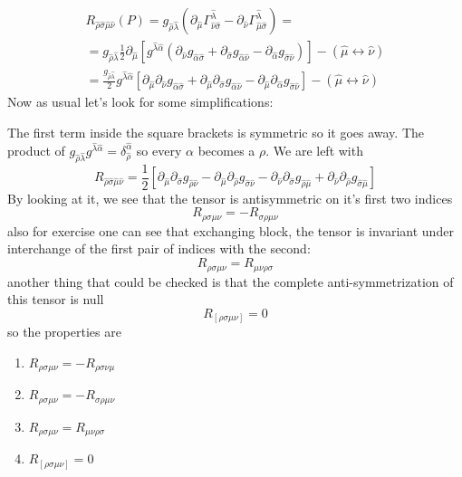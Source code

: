 \begin{gather*}
R_{\hat{\rho }\hat{\sigma }\hat{\mu }\hat{\nu }} \left( P \right) = g_{\hat{\rho }\hat{\lambda }} \left( \partial_{\hat{\mu }} \Gamma ^{\hat{\lambda }}_{\hat{\nu }\hat{\sigma }} - \partial_{\hat{\nu }} \Gamma ^{\hat{\lambda }}_{\hat{\mu }\hat{\sigma }} \right)  = \\
= g_{\hat{\rho }\hat{\lambda }} \frac{1}{2} \partial_{\hat{\mu } } [ g^{\hat{\lambda }\hat{\alpha }} \left( \partial_{\hat{\nu }} g_{\hat{\alpha  }\hat{\sigma }} + \partial_{\hat{\sigma }} g_{\hat{\alpha }\hat{\nu }} - \partial_{\hat{\alpha }} g_{\hat{\sigma }\hat{\nu }} \right) ] - \left( \hat{\mu } \leftrightarrow \hat{\nu } \right) \\
= \frac{g_{\hat{\rho }\hat{\lambda }}}{2} g^{\hat{\lambda }\hat{\alpha }} [ \partial_{\hat{\mu }} \partial_{\hat{\nu }} g_{\hat{\alpha }\hat{\sigma }} + \partial_{\hat{\mu }}\partial_{\hat{\sigma }} g_{\hat{\alpha }\hat{\nu }} - \partial_{\hat{\mu }}\partial_{\hat{\alpha }} g_{\hat{\sigma }\hat{\nu }}] - \left( \hat{\mu } \leftrightarrow \hat{\nu } \right)
\end{gather*} %
Now as usual let's look for some simplifications: \par
The first term inside the square brackets is symmetric so it goes away. The product of $g_{\hat{\rho }\hat{\lambda }} g^{\hat{\lambda }\hat{\alpha }} = \delta ^{\hat{\alpha }}_{\hat{\rho }} $ so every $\alpha $ becomes a $\rho $. We are left with
\begin{equation}
	R_{\hat{\rho }\hat{\sigma }\hat{\mu }\hat{\nu }} = \frac{1}{2} [\partial_{\hat{\mu }}\partial_{\hat{\sigma }} g_{\hat{\rho }\hat{\nu }} - \partial_{\hat{\mu }}\partial_{\hat{\rho }}g_{\hat{\sigma }\hat{\nu }} - \partial_{\hat{\nu }}\partial_{\hat{\sigma }} g_{\hat{\rho }\hat{\mu }}+ \partial_{\hat{\nu }}\partial_{\hat{\rho }}g_{\hat{\sigma }\hat{\mu }}]
\end{equation}
By looking at it, we see that the tensor is antisymmetric on it's first two indices
\[
R_{\rho \sigma \mu \nu } = - R_{\sigma \rho \mu \nu }
\]
also for exercise one can see that exchanging block, the tensor is invariant under interchange of the first pair of indices with the second:
\[
R_{\rho \sigma \mu \nu } = R_{\mu \nu \rho \sigma }
\]
another thing that could be checked is that the complete anti-symmetrization of this tensor is null
\[
	R_{[\rho \sigma \mu \nu ]} = 0
\]
so the properties are
\begin{enumerate}
\item $R_{\rho \sigma \mu \nu }  = - R_{\rho \sigma \nu \mu }$
\item $R_{\rho \sigma \mu \nu } = - R_{\sigma \rho \mu \nu }$
\item $R_{\rho \sigma \mu \nu } = R_{\mu \nu \rho \sigma }$
\item $R_{[\rho \sigma \mu \nu ]} = 0$
\end{enumerate}
